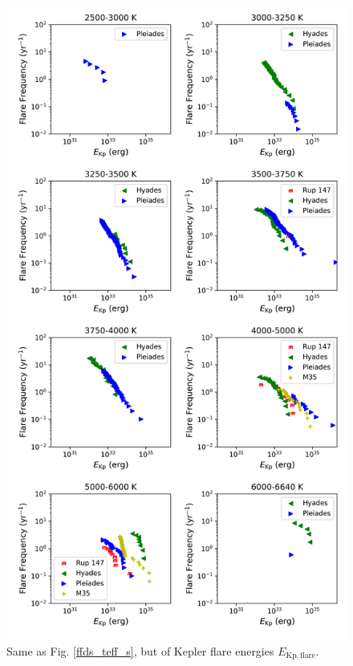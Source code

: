 \documentclass{aa}
\begin{document}
         \begin{figure}
         \centering
            \includegraphics[width=13cm]{pics/FFDs/FFDs_Teff_aggregated_erg_2019_03_22_15.png}
         \caption{Same as Fig. \ref{ffds_teff_s}, but of Kepler flare energies $E_\mathrm{Kp,flare}$.}
          \label{ffds_teff_erg}
   \end{figure}
\end{document}

